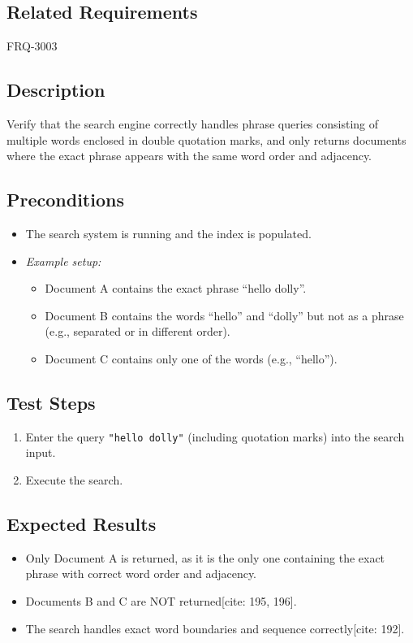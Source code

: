 \documentclass{article}
\begin{document}
\subsection*{Related Requirements}
FRQ-3003

\subsection*{Description}
Verify that the search engine correctly handles phrase queries consisting of multiple words enclosed in double quotation marks, and only returns documents where the exact phrase appears with the same word order and adjacency.

\subsection*{Preconditions}
\begin{itemize}
    \item The search system is running and the index is populated.
    \item[] \textit{Example setup:}
    \begin{itemize}
        \item Document A contains the exact phrase ``hello dolly''.
        \item Document B contains the words ``hello'' and ``dolly'' but not as a phrase (e.g., separated or in different order).
        \item Document C contains only one of the words (e.g., ``hello'').
    \end{itemize}
\end{itemize}

\subsection*{Test Steps}
\begin{enumerate}
    \item Enter the query \texttt{"hello dolly"} (including quotation marks) into the search input.
    \item Execute the search.
\end{enumerate}

\subsection*{Expected Results}
\begin{itemize}
    \item Only Document A is returned, as it is the only one containing the exact phrase with correct word order and adjacency.
    \item Documents B and C are NOT returned[cite: 195, 196].
    \item The search handles exact word boundaries and sequence correctly[cite: 192].
\end{itemize}
\end{document}
